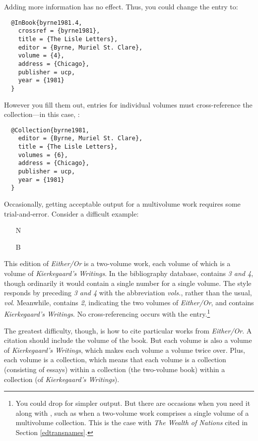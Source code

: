 \documentclass[11pt,letterpaper,oneside]{article}
\begin{document}
Adding more information has no effect. Thus, you could change the
entry to:

\begin{lstlisting}
  @InBook{byrne1981.4,
    crossref = {byrne1981},
    title = {The Lisle Letters},
    editor = {Byrne, Muriel St. Clare},
    volume = {4},
    address = {Chicago},
    publisher = ucp,
    year = {1981}
  }
\end{lstlisting}

\noindent However you fill them out, entries for individual volumes
must cross-reference the col\-lec\-tion---in this case,
:

\begin{lstlisting}
  @Collection{byrne1981,
    editor = {Byrne, Muriel St. Clare},
    title = {The Lisle Letters},
    volumes = {6},
    address = {Chicago},
    publisher = ucp,
    year = {1981}
  }
\end{lstlisting}

Occasionally, getting acceptable output for a multivolume work
requires some trial-and-error. Consider a difficult example:

\begin{itemize}
\item[N] 

\item[B] 
\end{itemize}

\noindent This edition of \textit{Either/Or} is a two-volume work,
each volume of which is a volume of \textit{Kierkegaard's Writings}.
In the bibliography database,  contains \textit{3 and
4}, though ordinarily it would contain a single number for a single
volume. The style responds by preceding \textit{3 and 4} with the
abbreviation \textit{vols.}, rather than the usual, \textit{vol}.
Meanwhile,  contains \textit{2}, indicating the two
volumes of \textit{Either/Or}, and  contains
\textit{Kierkegaard's Writings}. No cross-referencing occurs with the
entry.\footnote{You could drop  for simpler output.
But there are occasions when you need it along with
, such as when a two-volume work comprises a single
volume of a multivolume collection. This is the case with \textit{The
Wealth of Nations} cited in Section \ref{edtransnames}.}

The greatest difficulty, though, is how to cite particular works from
\textit{Either/Or}. A citation should include the volume of the book.
But each volume is also a volume of \textit{Kierkegaard's Writings},
which makes each volume a volume twice over. Plus, each volume is a
collection, which means that each volume is a collection (consisting
of essays) within a collection (the two-volume book) within a
collection (of \textit{Kierkegaard's Writings}).
\end{document}
